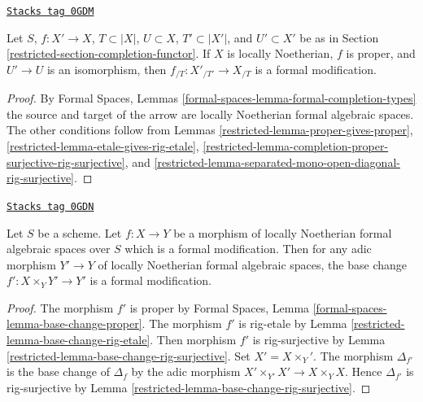 \begin{lemma}
\label{restricted-lemma-modification-gives-formal-modification}
\href{https://stacks.math.columbia.edu/tag/0GDM}{\texttt{Stacks tag 0GDM}}

Let $S$, $f : X' \to X$, $T \subset |X|$, $U \subset X$,
$T' \subset |X'|$, and $U' \subset X'$ be as in
Section \ref{restricted-section-completion-functor}.
If $X$ is locally Noetherian, $f$ is proper, and $U' \to U$ is an isomorphism,
then $f_{/T} : X'_{/T'} \to X_{/T}$ is a formal modification.
\end{lemma}

\begin{proof}

By Formal Spaces, Lemmas \ref{formal-spaces-lemma-formal-completion-types}
the source and target of the arrow are locally Noetherian
formal algebraic spaces.
The other conditions follow from
Lemmas \ref{restricted-lemma-proper-gives-proper},
\ref{restricted-lemma-etale-gives-rig-etale},
\ref{restricted-lemma-completion-proper-surjective-rig-surjective}, and
\ref{restricted-lemma-separated-mono-open-diagonal-rig-surjective}.
\end{proof}

\begin{lemma}
\label{restricted-lemma-base-change-formal-modification}
\href{https://stacks.math.columbia.edu/tag/0GDN}{\texttt{Stacks tag 0GDN}}

Let $S$ be a scheme. Let $f : X \to Y$ be a morphism of locally Noetherian
formal algebraic spaces over $S$ which is a formal modification.
Then for any adic morphism $Y' \to Y$ of locally Noetherian formal
algebraic spaces, the base change $f' : X \times_Y Y' \to Y'$ is
a formal modification.
\end{lemma}

\begin{proof}

The morphism $f'$ is proper by
Formal Spaces, Lemma \ref{formal-spaces-lemma-base-change-proper}.
The morphism $f'$ is rig-etale by
Lemma \ref{restricted-lemma-base-change-rig-etale}.
Then morphism $f'$ is rig-surjective by
Lemma \ref{restricted-lemma-base-change-rig-surjective}. Set $X' = X \times_ Y'$.
The morphism $\Delta_{f'}$ is the base change of
$\Delta_f$ by the adic morphism $X' \times_{Y'} X' \to X \times_Y X$.
Hence $\Delta_{f'}$ is rig-surjective by
Lemma \ref{restricted-lemma-base-change-rig-surjective}.
\end{proof}

